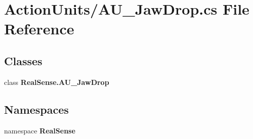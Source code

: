 \section{Action\+Units/\+A\+U\+\_\+\+Jaw\+Drop.cs File Reference}
\label{_a_u___jaw_drop_8cs}
\subsection*{Classes}
\begin{DoxyCompactItemize}
\item 
class \textbf{ Real\+Sense.\+A\+U\+\_\+\+Jaw\+Drop}
\end{DoxyCompactItemize}
\subsection*{Namespaces}
\begin{DoxyCompactItemize}
\item 
namespace \textbf{ Real\+Sense}
\end{DoxyCompactItemize}

